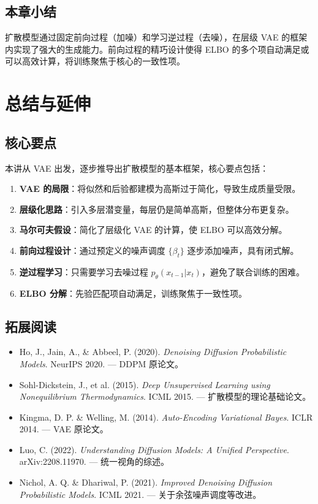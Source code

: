 \documentclass[a4paper]{article}
\begin{document}
\subsection{本章小结}

扩散模型通过固定前向过程（加噪）和学习逆过程（去噪），在层级 VAE 的框架内实现了强大的生成能力。前向过程的精巧设计使得 ELBO 的多个项自动满足或可以高效计算，将训练聚焦于核心的一致性项。


\section{总结与延伸}

\subsection{核心要点}

本讲从 VAE 出发，逐步推导出扩散模型的基本框架，核心要点包括：

\begin{enumerate}
    \item \textbf{VAE 的局限}：将似然和后验都建模为高斯过于简化，导致生成质量受限。
    \item \textbf{层级化思路}：引入多层潜变量，每层仍是简单高斯，但整体分布更复杂。
    \item \textbf{马尔可夫假设}：简化了层级化 VAE 的计算，使 ELBO 可以高效分解。
    \item \textbf{前向过程设计}：通过预定义的噪声调度 $\{\beta_t\}$ 逐步添加噪声，具有闭式解。
    \item \textbf{逆过程学习}：只需要学习去噪过程 $p_\theta(x_{t-1}|x_t)$，避免了联合训练的困难。
    \item \textbf{ELBO 分解}：先验匹配项自动满足，训练聚焦于一致性项。
\end{enumerate}

\subsection{拓展阅读}

\begin{itemize}
    \item Ho, J., Jain, A., \& Abbeel, P. (2020). \textit{Denoising Diffusion Probabilistic Models}. NeurIPS 2020. --- DDPM 原论文。
    \item Sohl-Dickstein, J., et al. (2015). \textit{Deep Unsupervised Learning using Nonequilibrium Thermodynamics}. ICML 2015. --- 扩散模型的理论基础论文。
    \item Kingma, D. P. \& Welling, M. (2014). \textit{Auto-Encoding Variational Bayes}. ICLR 2014. --- VAE 原论文。
    \item Luo, C. (2022). \textit{Understanding Diffusion Models: A Unified Perspective}. arXiv:2208.11970. --- 统一视角的综述。
    \item Nichol, A. Q. \& Dhariwal, P. (2021). \textit{Improved Denoising Diffusion Probabilistic Models}. ICML 2021. --- 关于余弦噪声调度等改进。
\end{itemize}

\end{document}

